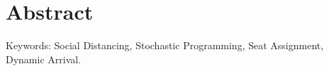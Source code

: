 
\section*{Abstract}



Keywords: Social Distancing, Stochastic Programming, Seat Assignment, Dynamic Arrival.
